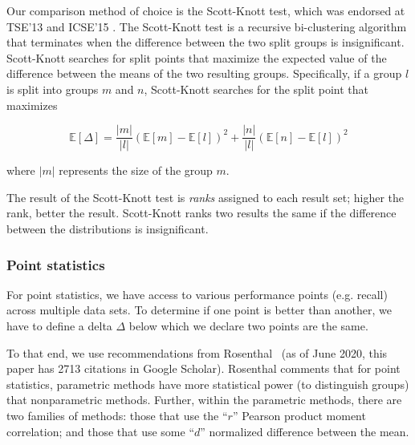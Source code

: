 \documentclass[10pt,compsoc,twocolumn]{IEEEtran}
\begin{document}
Our comparison method of choice is the Scott-Knott test, which was endorsed at TSE'13 \cite{mittas2012ranking} and ICSE'15 \cite{ghotra2015revisiting}. The Scott-Knott test is a recursive bi-clustering algorithm that terminates when the difference between the two split groups is insignificant. Scott-Knott searches for split points that maximize the expected value of the difference between the means of the two resulting groups. Specifically, if a group $l$ is split into groups $m$ and $n$, Scott-Knott searches for the split point that maximizes

\[
    \mathbb{E}[\Delta] = \frac{|m|}{|l|}\left( \mathbb{E}[m] - \mathbb{E}[l] \right)^2 + \frac{|n|}{|l|}\left( \mathbb{E}[n] - \mathbb{E}[l] \right)^2
\]

where $|m|$ represents the size of the group $m$.

The result of the Scott-Knott test is \textit{ranks} assigned to each result set; higher the rank, better the result. Scott-Knott ranks two results the same if the difference between the distributions is insignificant.

\subsubsection{Point statistics}\label{sec:point}



For point statistics, we have access to various performance points (e.g. recall) across multiple data sets.
To determine if one point is better than another, we have to define a delta $\Delta$
below which we declare two points are the same.

To that end, we
use recommendations from
Rosenthal~\cite{rosenthal1994parametric}
(as of June 2020,  this paper has 2713  citations in Google Scholar).  Rosenthal comments that for point statistics, 
  parametric methods have more statistical power (to distinguish groups) that nonparametric methods. Further, within the parametric methods, there are two families of methods: 
  those that use the
  ``$r$''  Pearson product moment correlation;
  and
  those that use some ``$d$'' normalized difference between the mean.
\end{document}

